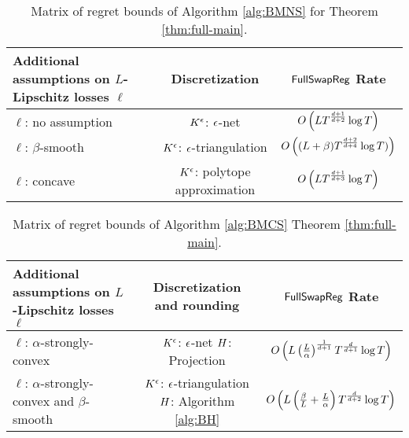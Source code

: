 \begin{table}[h]\label{table:main-results-1}
\begin{center}\caption{Matrix of regret bounds of Algorithm \ref{alg:BMNS} for Theorem \ref{thm:full-main}.}
    \begin{tabular}{|l|c|c|}
        \hline
        \makecell{Additional assumptions \\ on $L$-Lipschitz losses $\ell$}
        & Discretization
        & $\mathsf{FullSwapReg}$ Rate\\
        \hline
        $\ell$: no assumption
        &$K^{\epsilon}$: $\epsilon$-net
        &$O\left(LT^{\frac{d+1}{d+2}}\log T\right)$\\
        \hline
        $\ell$: $\beta$-smooth
        &$K^{\epsilon}$: $\epsilon$-triangulation
        & $O\left((L+\beta)T^{\frac{d+2}{d+4}} \log T)\right)$\\
        \hline
        $\ell$: concave
        &\makecell{$K^{\epsilon}$: polytope\\ approximation}
        & $O\left(LT^{\frac{d+1}{d+3}}\log T\right)$\\
        \hline
    \end{tabular}
\end{center}
\end{table}

\begin{table}[h]\label{table:main-results-2}
\begin{center}\caption{Matrix of regret bounds of Algorithm \ref{alg:BMCS} Theorem \ref{thm:full-main}.}
    \begin{tabular}{|l|c|c|}
        \hline
        \makecell{Additional assumptions \\ on $L$-Lipschitz losses $\ell$}
        & \makecell{Discretization\\ and rounding}
        & $\mathsf{FullSwapReg}$ Rate\\
        \hline
        $\ell$: $\alpha$-strongly-convex
        &\makecell{$K^{\epsilon}$: $\epsilon$-net \\ $H$: Projection}
        &$O\left(L\left(\frac{L}{\alpha}\right)^{\frac{1}{d+1}}T^{\frac{d}{d+1}}\log T\right)$\\
        \hline
        \makecell{$\ell$: $\alpha$-strongly-convex\\ and $\beta$-smooth}
        &\makecell{$K^{\epsilon}$: $\epsilon$-triangulation \\ $H$: Algorithm \ref{alg:BH}}
        &$O\left(L\left(\frac{\beta}{L}+\frac{L}{\alpha}\right)T^{\frac{d}{d+2}}\log T\right)$\\
        \hline
    \end{tabular}
\end{center}
\end{table}

